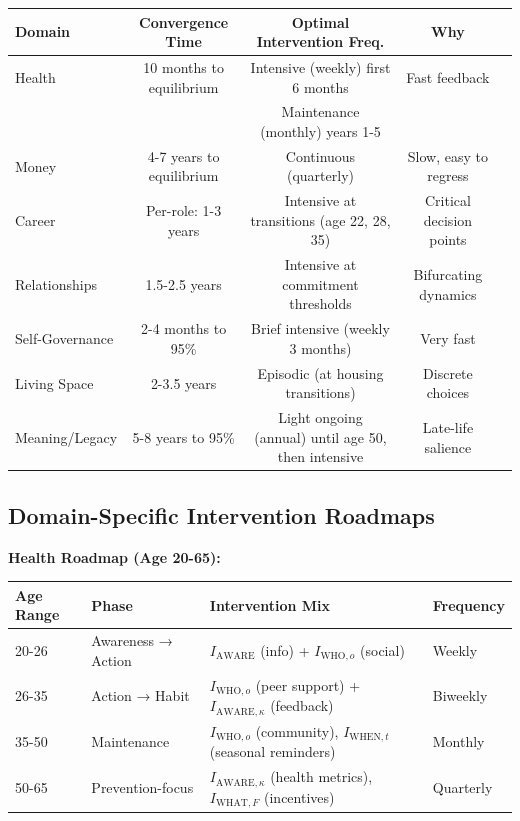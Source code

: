 {{{\begin{center}
\small
\begin{tabular}{@{}lcccr@{}}
\toprule
\textbf{Domain} & \textbf{Convergence Time} & \textbf{Optimal Intervention Freq.} & \textbf{Why} \\
\midrule
Health & 10 months to equilibrium & Intensive (weekly) first 6 months & Fast feedback \\
 &  & Maintenance (monthly) years 1-5 &  \\
Money & 4-7 years to equilibrium & Continuous (quarterly) & Slow, easy to regress \\
Career & Per-role: 1-3 years & Intensive at transitions (age 22, 28, 35) & Critical decision points \\
Relationships & 1.5-2.5 years & Intensive at commitment thresholds & Bifurcating dynamics \\
Self-Governance & 2-4 months to 95\% & Brief intensive (weekly 3 months) & Very fast \\
Living Space & 2-3.5 years & Episodic (at housing transitions) & Discrete choices \\
Meaning/Legacy & 5-8 years to 95\% & Light ongoing (annual) until age 50, then intensive & Late-life salience \\
\midrule
\end{tabular}
\end{center}

\subsection{Domain-Specific Intervention Roadmaps}

\textbf{Health Roadmap (Age 20-65):}

\begin{center}
\begin{tabular}{@{}llll@{}}
\toprule
\textbf{Age Range} & \textbf{Phase} & \textbf{Intervention Mix} & \textbf{Frequency} \\
\midrule
20-26 & Awareness → Action & $I_{\text{AWARE}}$ (info) + $I_{\text{WHO},o}$ (social) & Weekly \\
26-35 & Action → Habit & $I_{\text{WHO},o}$ (peer support) + $I_{\text{AWARE},\kappa}$ (feedback) & Biweekly \\
35-50 & Maintenance & $I_{\text{WHO},o}$ (community), $I_{\text{WHEN},t}$ (seasonal reminders) & Monthly \\
50-65 & Prevention-focus & $I_{\text{AWARE},\kappa}$ (health metrics), $I_{\text{WHAT},F}$ (incentives) & Quarterly \\
\midrule
\end{tabular}
\end{center}

}}}
